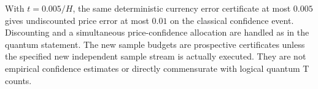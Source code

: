 With \(t=0.005/H\), the same deterministic currency error certificate at most \(0.005\) gives undiscounted price error at most \(0.01\) on the classical confidence event. Discounting and a simultaneous price-confidence allocation are handled as in the quantum statement. The new sample budgets are prospective certificates unless the specified new independent sample stream is actually executed. They are not empirical confidence estimates or directly commensurate with logical quantum T counts.
